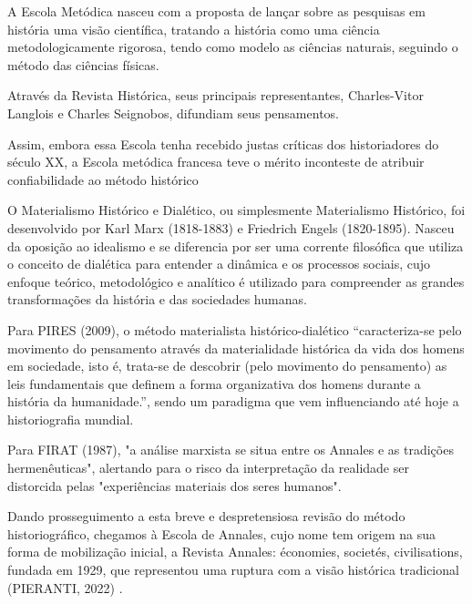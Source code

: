 A Escola Metódica nasceu com a proposta de  lançar sobre as pesquisas em história uma visão científica, tratando a história como uma ciência metodologicamente rigorosa, tendo como modelo as ciências naturais, seguindo o método das ciências físicas.

Através da Revista Histórica, seus principais representantes, Charles-Vitor Langlois e Charles Seignobos, difundiam seus pensamentos.


\noindent\begin{center}\mbox{\centering{}}\end{center}


Assim, embora essa Escola tenha recebido justas críticas dos historiadores do século XX, a Escola metódica francesa teve o mérito inconteste de atribuir confiabilidade ao método histórico

O Materialismo Histórico e Dialético, ou simplesmente Materialismo Histórico, foi desenvolvido  por Karl Marx (1818-1883) e Friedrich Engels (1820-1895). Nasceu da oposição ao idealismo e se diferencia por ser uma corrente filosófica que utiliza o conceito de dialética para entender a dinâmica e os processos sociais, cujo enfoque teórico, metodológico e analítico é utilizado para compreender as grandes transformações da história e das sociedades humanas.

Para  PIRES (2009), o método materialista histórico-dialético “caracteriza-se pelo movimento do pensamento através da materialidade histórica da vida dos homens em sociedade, isto é, trata-se de descobrir (pelo movimento do pensamento) as leis fundamentais que definem a forma organizativa dos homens durante a história da humanidade.”, sendo um paradigma que vem influenciando até hoje a historiografia mundial.

Para FIRAT (1987), "a análise marxista se situa entre os Annales e as tradições hermenêuticas", alertando para o risco da interpretação da realidade ser distorcida pelas "experiências materiais dos seres humanos".

Dando prosseguimento a esta breve e despretensiosa revisão do método historiográfico, chegamos à Escola de Annales, cujo nome tem origem na sua forma de mobilização inicial, a Revista Annales: économies, societés, civilisations, fundada em 1929, que representou uma ruptura com a visão histórica tradicional (PIERANTI, 2022) .

